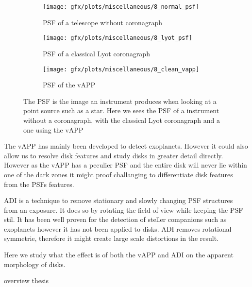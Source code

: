 \begin{figure}[h!]
      \begin{subfigure}[t]{0.5\textwidth}
        \texttt{[image: gfx/plots/miscellaneous/8\_normal\_psf]}
        \caption{\ac{PSF} of a telescope without coronagraph}
        \label{fig:classic_psf}
      \end{subfigure}
      \begin{subfigure}[t]{0.5 \textwidth}
        \texttt{[image: gfx/plots/miscellaneous/8\_lyot\_psf]}
        \label{fig:lyot}
        \caption{\ac{PSF} of a classical Lyot coronagraph}
      \end{subfigure}%
      
      \begin{subfigure}[]{0.5\textwidth}
        \texttt{[image: gfx/plots/miscellaneous/8\_clean\_vapp]}
        \caption{\ac{PSF} of the \ac{vAPP}}
      \end{subfigure}
      
  \caption{The \ac{PSF} is the image an instrument produces when looking at a point source such as a star. Here we sees the \ac{PSF} of a instrument without a coronagraph, with the classical Lyot coronagraph and a one using the \ac{vAPP} }
  \label{fig:vapp_vs_lyot}
\end{figure}

The \ac{vAPP} has mainly been developed to detect exoplanets. However it could also allow us to resolve disk features and study disks in greater detail directly. However as the \ac{vAPP} has a peculier \ac{PSF} and the entire disk will never lie within one of the dark zones it might proof challanging to differentiate disk features from the \acp{PSF} features. 

\ac{ADI} is a technique to remove stationary and slowly changing \ac{PSF} structures from an exposure. It does so by rotating the field of view while keeping the \ac{PSF} stil. It has been well proven for the detection of steller companions such as exoplanets however it has not been applied to disks. \ac{ADI} removes rotational symmetrie, therefore it might create large scale distortions in the result.

Here we study what the effect is of both the \ac{vAPP} and \ac{ADI} on the apparent morphology of disks.

overview thesis

